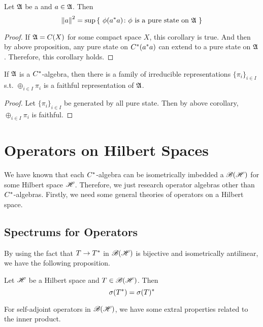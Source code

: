 \documentclass[a4paper,11pt]{report}
\begin{document}
\begin{cor}
	Let $\mathfrak{A}$ be a \Cs and $a \in \mathfrak{A}$. Then
	\begin{equation*}
		\left\lVert a\right\lVert^2 = \sup{\{~\phi(a^{*}a) \colon \phi \text{ is a pure state on } \mathfrak{A}~\}}
	\end{equation*}
\end{cor}
\begin{proof}
	If $\mathfrak{A}=C(X)$ for some compact space $X$, this corollary is true. And then by above proposition, any pure state on $C^{*}(a^{*}a)$ can extend to a pure state on $\mathfrak{A}$. Therefore, this corollary holds.
\end{proof}

\begin{thm}
	If $\mathfrak{A}$ is a $C^{*}$-algebra, then there is a family of irreducible representations $\{\pi_i\}_{i\in I}$ s.t. $\oplus_{i \in I} \pi_{i}$ is a faithful representation of $\mathfrak{A}$.
\end{thm}
\begin{proof}
	Let $\{\pi_i\}_{i\in I}$ be generated by all pure state. Then by above corollary, $\oplus_{i \in I} \pi_{i}$ is faithful.
\end{proof}

\section{Operators on Hilbert Spaces}

We have known that each $C^{*}$-algebra can be isometrically imbedded a $\mathscr{B(H)}$ for some Hilbert space $\mathscr{H}$. Therefore, we just research operator algebras other than $C^{*}$-algebras. Firstly, we need some general theories of operators on a Hilbert space.

\subsection{Spectrums for Operators}

By using the fact that $T \rightarrow T^{*}$ in $\mathscr{B(H)}$ is bijective and isometrically antilinear, we have the following proposition.
\begin{prop}
	Let $\mathscr{H}$ be a Hilbert space and $T \in \mathscr{B(H)}$. Then
	\begin{equation*}
		\sigma(T^{*}) = \sigma(T)^{*} 
	\end{equation*}
\end{prop}

For self-adjoint operators in $\mathscr{B(H)}$, we have some extral properties related to the inner product.
\end{document}
